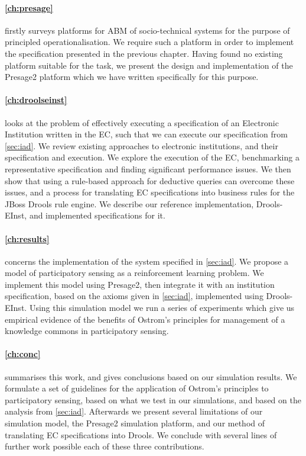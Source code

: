 \paragraph{\autoref{ch:presage}} firstly surveys platforms for \ac{ABM} of
socio-technical systems for the purpose of principled operationalisation. We
require such a platform in order to implement the specification presented in
the previous chapter. Having found no existing platform suitable for the task,
we present the design and implementation of the Presage2 platform which we
have written specifically for this purpose.

\paragraph{\autoref{ch:droolseinst}} looks at the problem of effectively
executing a specification of an Electronic Institution written in the \ac{EC},
such that we can execute our specification from \autoref{sec:iad}. We review
existing approaches to electronic institutions, and their specification and
execution. We explore the execution of the \ac{EC}, benchmarking a
representative specification and finding significant performance issues. We
then show that using a rule-based approach for deductive queries can overcome
these issues, and\hl{ }a process for translating \ac{EC} specifications into
business rules for the JBoss Drools rule engine. We describe our reference
implementation, Drools-EInst, and implemented specifications for it.

\paragraph{\autoref{ch:results}} concerns the implementation of the system
specified in \autoref{sec:iad}. We propose a model of participatory sensing as
a reinforcement learning problem. We implement this model using Presage2, then
integrate it with an institution specification, based on the axioms given in
\autoref{sec:iad}, implemented using Drools-EInst. Using this simulation model
we run a series of experiments which give us empirical evidence of the
benefits of Ostrom's principles for management of a knowledge commons in
participatory sensing.

\paragraph{\autoref{ch:conc}} summarises this work, and gives conclusions
based on our simulation results. We formulate a set of guidelines for the
application of Ostrom's principles to participatory sensing, based on what we
test in our simulations, and based on the analysis from \autoref{sec:iad}.
Afterwards we present several limitations of our simulation model, the
Presage2 simulation platform, and our method of translating \ac{EC}
specifications into Drools. We conclude with several lines of further work
possible each of these three contributions.

